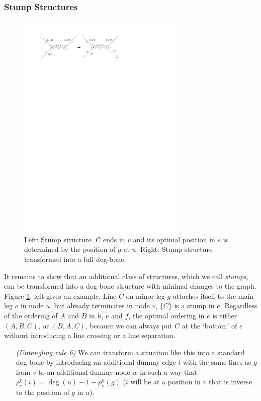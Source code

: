 \documentclass[format=acmsmall, review=false, screen=true]{acmart}
\begin{document}
\subsubsection{Stump Structures}

\begin{figure}
  \includegraphics[width=0.7\textwidth, page=1]{untangling/stump.pdf}
  \caption{Left: Stump structure. $C$ ends in $v$ and its optimal position in $e$ is determined by the position of $g$ at $u$. Right: Stump structure transformed into a full dog-bone.}  
  \label{FIG:untangle_stump}
\end{figure}

It remains to show that an additional class of structures, which we call \emph{stumps}, can be transformed into a dog-bone structure with minimal changes to the graph.
Figure \ref{FIG:untangle_stump}, left gives an example. Line $C$ on minor leg $g$ attaches itself to the main leg $e$ in node $u$, but already terminates in node $v$, $\{C\}$ is a stump in $e$.
Regardless of the ordering of $A$ and $B$ in $h$, $e$ and $f$, the optimal ordering in $e$ is either $(A, B, C)$, or $(B, A, C)$, because we can always put $C$ at the `bottom' of $e$ without introducing a line crossing or a line separation.
\begin{enumerate}[parsep=0.5mm, wide, labelwidth=0mm, itemindent=2.3mm]
  \setlength\itemsep{1pt}
  \item[\emph{(Untangling rule 6)}]We can transform a situation like this into a standard dog-bone by introducing an additional dummy edge $i$ with the same lines as $g$ from $v$ to an additional dummy node $w$ in such a way that $\rho^v_e(i) = \deg(u) - 1 - \rho^u_e(g)$ ($i$ will be at a position in $v$ that is inverse to the position of $g$ in $u$). 
\end{enumerate}
\end{document}
